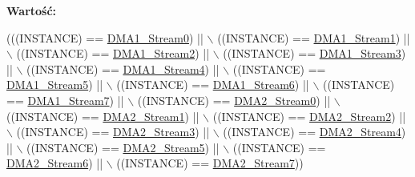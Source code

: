{\bfseries Wartość\+:}
\begin{DoxyCode}
(((INSTANCE) == \hyperlink{group___peripheral__declaration_ga61247dd5d594289c404dd8774202dfd8}{DMA1\_Stream0}) || \(\backslash\)
                                              ((INSTANCE) == \hyperlink{group___peripheral__declaration_gaf7d82f110f19982d483eebc465d222b2}{DMA1\_Stream1}) || \(\backslash\)
                                              ((INSTANCE) == \hyperlink{group___peripheral__declaration_gad0e2140b8eeec3594035f1a7bf2a7250}{DMA1\_Stream2}) || \(\backslash\)
                                              ((INSTANCE) == \hyperlink{group___peripheral__declaration_ga96ac1af7a92469fe86a9fbdec091f25d}{DMA1\_Stream3}) || \(\backslash\)
                                              ((INSTANCE) == \hyperlink{group___peripheral__declaration_ga87df45f4b82e0b3a8c1b17f1a77aecdb}{DMA1\_Stream4}) || \(\backslash\)
                                              ((INSTANCE) == \hyperlink{group___peripheral__declaration_gac3abc20f80e25c19b02104ad34eae652}{DMA1\_Stream5}) || \(\backslash\)
                                              ((INSTANCE) == \hyperlink{group___peripheral__declaration_gac95127480470900755953f1cfe68567d}{DMA1\_Stream6}) || \(\backslash\)
                                              ((INSTANCE) == \hyperlink{group___peripheral__declaration_ga8ecdeaf43d0f4207dab1fdb4d7bf8d26}{DMA1\_Stream7}) || \(\backslash\)
                                              ((INSTANCE) == \hyperlink{group___peripheral__declaration_ga3a2efe5fd7a7a79be3b08a1670bbd016}{DMA2\_Stream0}) || \(\backslash\)
                                              ((INSTANCE) == \hyperlink{group___peripheral__declaration_gae96f15d34d3c41c16fce69bc2878151a}{DMA2\_Stream1}) || \(\backslash\)
                                              ((INSTANCE) == \hyperlink{group___peripheral__declaration_ga71bb410664b861ff0520f08976e24ee1}{DMA2\_Stream2}) || \(\backslash\)
                                              ((INSTANCE) == \hyperlink{group___peripheral__declaration_gaa6ead6a5ca6b8df70b5505aaeec6fd2e}{DMA2\_Stream3}) || \(\backslash\)
                                              ((INSTANCE) == \hyperlink{group___peripheral__declaration_gae32674772021620800275dd3b6d62c2f}{DMA2\_Stream4}) || \(\backslash\)
                                              ((INSTANCE) == \hyperlink{group___peripheral__declaration_gac40f58718761251875b5a897287efd83}{DMA2\_Stream5}) || \(\backslash\)
                                              ((INSTANCE) == \hyperlink{group___peripheral__declaration_ga11a00b283e0911cd427e277e5a314ccc}{DMA2\_Stream6}) || \(\backslash\)
                                              ((INSTANCE) == \hyperlink{group___peripheral__declaration_gacc135dbca0eca67d5aa0abc555f053ce}{DMA2\_Stream7}))
\end{DoxyCode}


